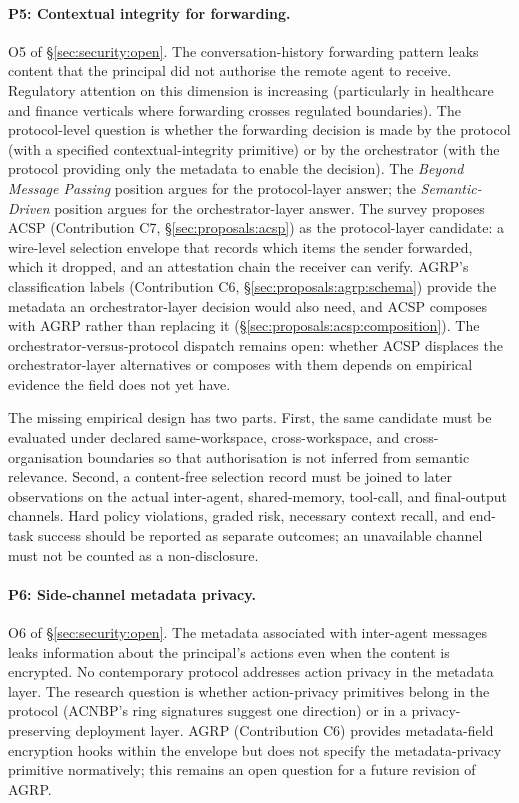 \paragraph{P5: Contextual integrity for
forwarding.}
O5 of \S\ref{sec:security:open}. The
conversation-history forwarding pattern leaks
content that the principal did not authorise
the remote agent to receive. Regulatory
attention on this dimension is increasing
(particularly in healthcare and finance
verticals where forwarding crosses regulated
boundaries). The protocol-level question is
whether the forwarding decision is made by the
protocol (with a specified contextual-integrity
primitive) or by the orchestrator (with the
protocol providing only the metadata to enable
the decision). The
\emph{Beyond Message Passing} position
\cite{beyond_message_passing} argues for the
protocol-layer answer; the
\emph{Semantic-Driven} position
\cite{semantic_driven} argues for the
orchestrator-layer answer. The survey proposes
ACSP (Contribution C7,
\S\ref{sec:proposals:acsp}) as the protocol-layer
candidate: a wire-level selection envelope that
records which items the sender forwarded, which
it dropped, and an attestation chain the receiver
can verify. AGRP's classification labels
(Contribution C6,
\S\ref{sec:proposals:agrp:schema}) provide the
metadata an orchestrator-layer decision would
also need, and ACSP composes with AGRP rather
than replacing it
(\S\ref{sec:proposals:acsp:composition}). The
orchestrator-versus-protocol dispatch remains
open: whether ACSP displaces the orchestrator-layer
alternatives or composes with them depends on
empirical evidence the field does not yet have.

The missing empirical design has two parts. First, the
same candidate must be evaluated under declared
same-workspace, cross-workspace, and cross-organisation
boundaries so that authorisation is not inferred from
semantic relevance. Second, a content-free selection
record must be joined to later observations on the actual
inter-agent, shared-memory, tool-call, and final-output
channels. Hard policy violations, graded risk, necessary
context recall, and end-task success should be reported as
separate outcomes; an unavailable channel must not be
counted as a non-disclosure.

\paragraph{P6: Side-channel metadata privacy.}
O6 of \S\ref{sec:security:open}. The metadata
associated with inter-agent messages leaks
information about the principal's actions even
when the content is encrypted. No contemporary
protocol addresses action privacy in the
metadata layer. The research question is
whether action-privacy primitives belong in the
protocol (ACNBP's ring signatures suggest one
direction) or in a privacy-preserving deployment
layer. AGRP (Contribution C6) provides
metadata-field encryption hooks within the
envelope but does not specify the
metadata-privacy primitive normatively; this
remains an open question for a future revision
of AGRP.

